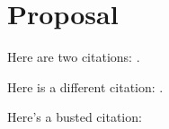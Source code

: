 \documentclass[12pt]{article}
\begin{document}
\section*{Proposal}

Here are two citations: \cite{Walker2015a,Feldmann2010}.

Here is a different citation: \cite{Kremer2015}.

Here's a busted citation: \cite{argon22222}



\end{document}
